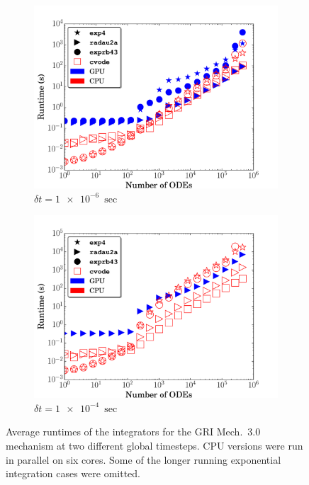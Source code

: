\documentclass[preprint]{elsarticle}
\begin{document}
\begin{figure}[htb]
  \centering
  \begin{subfigure}{0.49\textwidth}
      \includegraphics[width=\linewidth]{GRI_1e-06_cpuvsgpu.pdf}
      \caption{$\delta t = \SI{1e-6}{\sec}$}
  \end{subfigure}
  \begin{subfigure}{0.49\textwidth}
      \includegraphics[width=\linewidth]{GRI_1e-04_cpuvsgpu.pdf}
      \caption{$\delta t = \SI{1e-4}{\sec}$}
  \end{subfigure}
  \caption{Average runtimes of the integrators for the GRI Mech.~3.0 mechanism at two different global timesteps. 
  CPU versions were run in parallel on six cores.
  Some of the longer running exponential integration cases were omitted.}
  \label{F:GRI_perf}
\end{figure}
\end{document}
